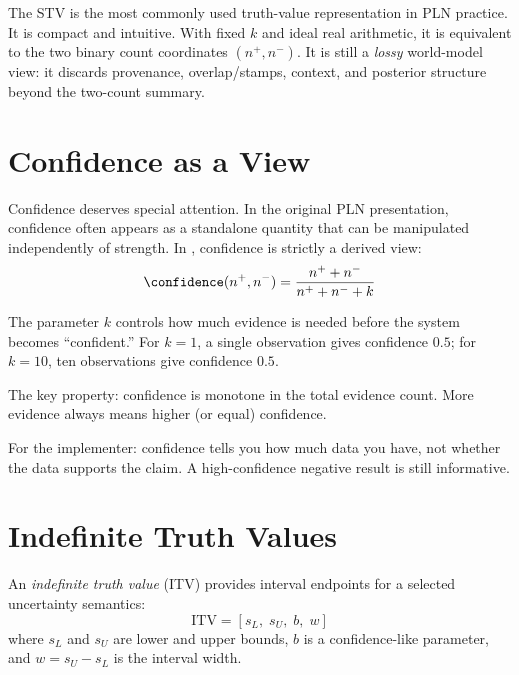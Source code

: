 \documentclass[11pt,openany]{report}
\begin{document}
The STV is the most commonly used truth-value representation in PLN
practice.  It is compact and intuitive.  With fixed $k$ and ideal real
arithmetic, it is equivalent to the two binary count coordinates
$(n^+,n^-)$.  It is still a \emph{lossy} world-model view: it discards
provenance, overlap/stamps, context, and posterior structure beyond the
two-count summary.


\section{Confidence as a View}

Confidence deserves special attention.  In the original PLN presentation,
confidence often appears as a standalone quantity that can be manipulated
independently of strength.  In \xiPLN{}, confidence is strictly a derived
view:
\[
  \confidence(n^+, n^-) = \frac{n^+ + n^-}{n^+ + n^- + k}
\]

The parameter $k$ controls how much evidence is needed before the system
becomes ``confident.''  For $k = 1$, a single observation gives
confidence $0.5$; for $k = 10$, ten observations give confidence
$0.5$.

The key property: confidence is monotone in the total evidence count.
More evidence always means higher (or equal) confidence.

For the implementer: confidence tells you how much data you have, not
whether the data supports the claim.  A high-confidence negative result
is still informative.

\section{Indefinite Truth Values}

An \emph{indefinite truth value} (ITV) provides interval endpoints for a
selected uncertainty semantics:
\[
  \mathrm{ITV} = [s_L,\; s_U,\; b,\; w]
\]
where $s_L$ and $s_U$ are lower and upper bounds, $b$ is a confidence-like
parameter, and $w = s_U - s_L$ is the interval width.
\end{document}
